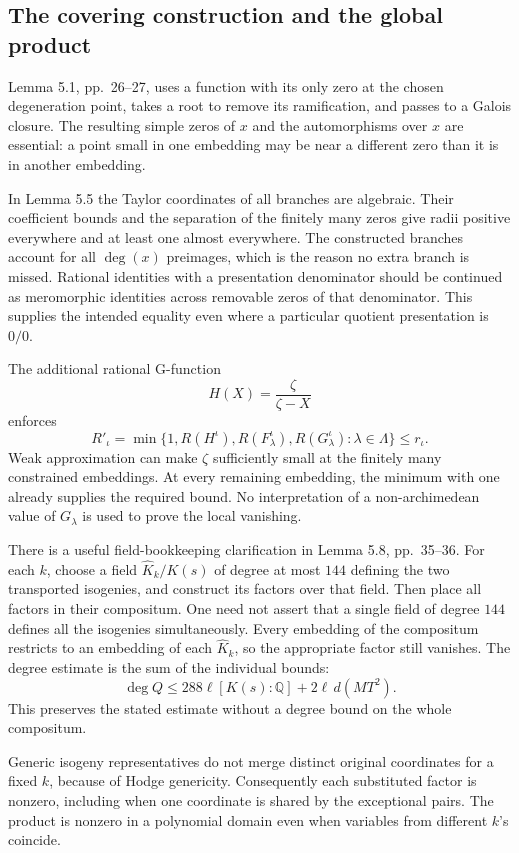 \documentclass[10pt]{article}
\begin{document}
\subsection*{The covering construction and the global product}
Lemma 5.1, pp. 26–27, uses a function with its only zero at the chosen degeneration point, takes a root to remove its ramification, and passes to a Galois closure. The resulting simple zeros of \(x\) and the automorphisms over \(x\) are essential: a point small in one embedding may be near a different zero than it is in another embedding.\par
In Lemma 5.5 the Taylor coordinates of all branches are algebraic. Their coefficient bounds and the separation of the finitely many zeros give radii positive everywhere and at least one almost everywhere. The constructed branches account for all \(\deg(x)\) preimages, which is the reason no extra branch is missed. Rational identities with a presentation denominator should be continued as meromorphic identities across removable zeros of that denominator. This supplies the intended equality even where a particular quotient presentation is \(0/0\).\par
The additional rational G-function \[H(X)=\frac{\zeta}{\zeta-X}\] enforces \[R'_\iota=\min\{1,R(H^\iota),R(F_\lambda^\iota),
                        R(G_\lambda^\iota):\lambda\in\Lambda\}
       \leq r_\iota.\] Weak approximation can make \(\zeta\) sufficiently small at the finitely many constrained embeddings. At every remaining embedding, the minimum with one already supplies the required bound. No interpretation of a non-archimedean value of \(G_\lambda\) is used to prove the local vanishing.\par
There is a useful field-bookkeeping clarification in Lemma 5.8, pp. 35–36. For each \(k\), choose a field \(\widehat K_k/K(s)\) of degree at most \(144\) defining the two transported isogenies, and construct its factors over that field. Then place all factors in their compositum. One need not assert that a single field of degree \(144\) defines all the isogenies simultaneously. Every embedding of the compositum restricts to an embedding of each \(\widehat K_k\), so the appropriate factor still vanishes. The degree estimate is the sum of the individual bounds: \[\deg Q\leq
 288\ell[K(s):\mathbb Q]+2\ell\,d(MT^2).\] This preserves the stated estimate without a degree bound on the whole compositum.\par
Generic isogeny representatives do not merge distinct original coordinates for a fixed \(k\), because of Hodge genericity. Consequently each substituted factor is nonzero, including when one coordinate is shared by the exceptional pairs. The product is nonzero in a polynomial domain even when variables from different \(k\)’s coincide.\par
\end{document}
